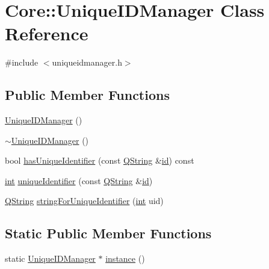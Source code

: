 \hypertarget{class_core_1_1_unique_i_d_manager}{\section{Core\-:\-:Unique\-I\-D\-Manager Class Reference}
\label{class_core_1_1_unique_i_d_manager}
}


{\ttfamily \#include $<$uniqueidmanager.\-h$>$}

\subsection*{Public Member Functions}
\begin{DoxyCompactItemize}
\item 
\hyperlink{group___core_plugin_ga6dccdc6ad65700076ffc7fa5636e32c7}{Unique\-I\-D\-Manager} ()
\item 
\hyperlink{group___core_plugin_ga74fea407a399cb61e5f626e68fb66ecb}{$\sim$\-Unique\-I\-D\-Manager} ()
\item 
bool \hyperlink{group___core_plugin_ga2f6cd087d32efa11b3979cf128fa1d77}{has\-Unique\-Identifier} (const \hyperlink{group___u_a_v_objects_plugin_gab9d252f49c333c94a72f97ce3105a32d}{Q\-String} \&\hyperlink{glext_8h_a58c2a664503e14ffb8f21012aabff3e9}{id}) const 
\item 
\hyperlink{ioapi_8h_a787fa3cf048117ba7123753c1e74fcd6}{int} \hyperlink{group___core_plugin_ga753353ca9958604a964c9cf807b77e60}{unique\-Identifier} (const \hyperlink{group___u_a_v_objects_plugin_gab9d252f49c333c94a72f97ce3105a32d}{Q\-String} \&\hyperlink{glext_8h_a58c2a664503e14ffb8f21012aabff3e9}{id})
\item 
\hyperlink{group___u_a_v_objects_plugin_gab9d252f49c333c94a72f97ce3105a32d}{Q\-String} \hyperlink{group___core_plugin_ga238c5f6580483438c581dfa0c5be022c}{string\-For\-Unique\-Identifier} (\hyperlink{ioapi_8h_a787fa3cf048117ba7123753c1e74fcd6}{int} uid)
\end{DoxyCompactItemize}
\subsection*{Static Public Member Functions}
\begin{DoxyCompactItemize}
\item 
static \hyperlink{class_core_1_1_unique_i_d_manager}{Unique\-I\-D\-Manager} $\ast$ \hyperlink{group___core_plugin_ga023f468a9492c282025fde5109e3d368}{instance} ()
\end{DoxyCompactItemize}


